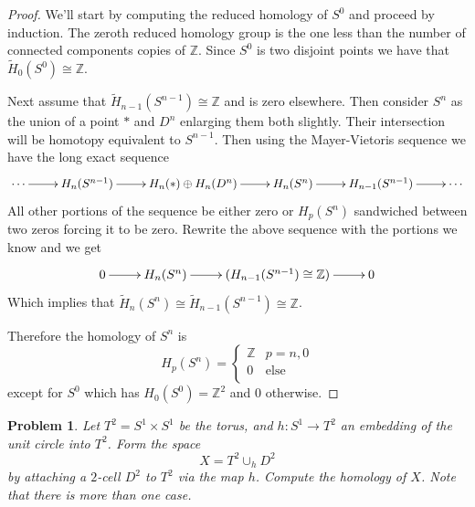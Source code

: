 \documentclass[10pt]{article}
\newcommand{\sk}{\vskip 10mm}
\newcommand{\bb}[1]{\mathbb{#1}}
\newcommand{\wt}[1]{\widetilde{#1}}
\theoremstyle{plain}
\newtheorem{problem}{Problem}
\theoremstyle{remark}
\begin{document}
\begin{proof}
  We'll start by computing the reduced homology of $S^0$ and proceed by induction.
  The zeroth reduced homology group is the one less than the number of
  connected components copies of $\bb{Z}$. Since $S^0$ is two disjoint points we
  have that $\wt{H}_0(S^0)\cong\bb{Z}$.

  Next assume that $\wt{H}_{n-1}(S^{n-1})\cong\bb{Z}$ and is zero elsewhere.
  Then consider $S^n$ as the union of a point $*$ and $D^n$ enlarging them both slightly.
  Their intersection will be homotopy equivalent to $S^{n-1}$.
  Then using the Mayer-Vietoris sequence we have the long exact sequence
  \[
    \xymatrix{
      \cdots \ar[r] &H_n(S^{n-1}) \ar[r] & H_n(*)\oplus H_n(D^n)\ar[r] & H_n(S^n) \ar[r]
      &H_{n-1}(S^{n-1})\ar[r] & \cdots \\
    }
  \]
  All other portions of the sequence be either zero or $H_p(S^n)$ sandwiched between
  two zeros forcing it to be zero. Rewrite the above sequence with the portions
  we know and we get
  \[
    \xymatrix{
      0\ar[r] & H_n(S^n) \ar[r]& (H_{n-1}(S^{n-1})\cong\bb{Z})\ar[r] & 0\\
    }
  \]
  Which implies that $\wt{H}_n(S^n)\cong \wt{H}_{n-1}(S^{n-1})\cong\bb{Z}$.

  Therefore the homology of $S^n$ is
  \[ H_p(S^n)=\left\{
      \begin{array}{cc}
        \bb{Z}& p=n,0\\
        0 & \mathrm{else}\\
      \end{array}
    \right.\]
  except for $S^0$ which has $H_0(S^0)=\bb{Z}^2$ and 0 otherwise.
\end{proof}

\sk

\begin{problem}
  Let $T^2 = S^1 \times S^1$ be the torus, and $h: S^1 \to T^2$ an embedding of the unit
  circle into $T^2$. Form the space 
  \begin{equation*}
    X = T^2 \cup_h D^2
  \end{equation*}
  by attaching a $2$-cell $D^2$ to $T^2$ via the map $h$. Compute the homology of $X$.
  Note that there is more than one case.
\end{problem}
\end{document}
